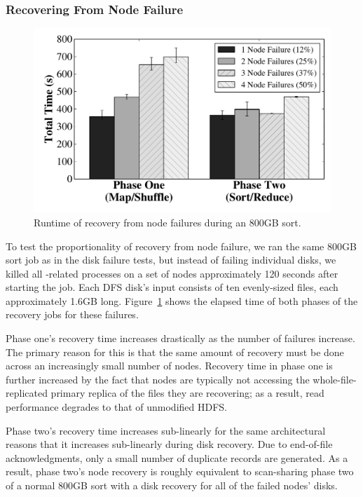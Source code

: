 \subsubsection{Recovering From Node Failure}

\begin{figure}
  \centering
  \includegraphics[width=\columnwidth]{fault_tolerance/graphs/node_recovery_proportionality.pdf}
  \caption{\label{fig:node_recovery_proportionality} Runtime of recovery from
    node failures during an 800GB sort.}
\end{figure}

To test the proportionality of recovery from node failure, we ran the same
800GB sort job as in the disk failure tests, but instead of failing individual
disks, we killed all \themis-related processes on a set of nodes approximately
120 seconds after starting the job. Each DFS disk's input consists of ten
evenly-sized files, each approximately 1.6GB
long. Figure~\ref{fig:node_recovery_proportionality} shows the elapsed time of
both phases of the recovery jobs for these failures.

Phase one's recovery time increases drastically as the number of failures
increase. The primary reason for this is that the same amount of recovery must
be done across an increasingly small number of nodes. Recovery time in phase
one is further increased by the fact that nodes are typically not accessing the
whole-file-replicated primary replica of the files they are recovering; as a
result, read performance degrades to that of unmodified HDFS.

Phase two's recovery time increases sub-linearly for the same architectural
reasons that it increases sub-linearly during disk recovery. Due to end-of-file
acknowledgments, only a small number of duplicate records are generated. As a
result, phase two's node recovery is roughly equivalent to scan-sharing phase
two of a normal 800GB sort with a disk recovery for all of the failed nodes'
disks.

